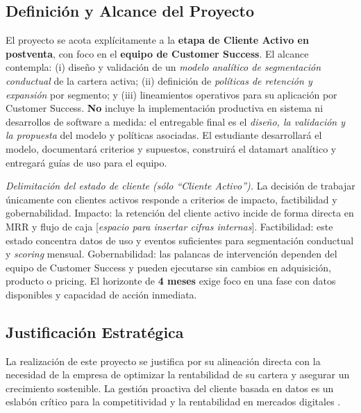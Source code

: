 \subsection{Definición y Alcance del Proyecto}

El proyecto se acota explícitamente a la \textbf{etapa de Cliente Activo en postventa}, con foco en el \textbf{equipo de Customer Success}. El alcance contempla: (i) diseño y validación de un \textit{modelo analítico de segmentación conductual} de la cartera activa; (ii) definición de \textit{políticas de retención y expansión} por segmento; y (iii) lineamientos operativos para su aplicación por Customer Success. \textbf{No} incluye la implementación productiva en sistema ni desarrollos de software a medida: el entregable final es el \textit{diseño, la validación y la propuesta} del modelo y políticas asociadas. El estudiante desarrollará el modelo, documentará criterios y supuestos, construirá el datamart analítico y entregará guías de uso para el equipo.

\textit{Delimitación del estado de cliente (sólo “Cliente Activo”).} La decisión de trabajar únicamente con clientes activos responde a criterios de impacto, factibilidad y gobernabilidad. Impacto: la retención del cliente activo incide de forma directa en MRR y flujo de caja [\textit{espacio para insertar cifras internas}]. Factibilidad: este estado concentra datos de uso y eventos suficientes para segmentación conductual y \textit{scoring} mensual. Gobernabilidad: las palancas de intervención dependen del equipo de Customer Success y pueden ejecutarse sin cambios en adquisición, producto o pricing. El horizonte de \textbf{4 meses} exige foco en una fase con datos disponibles y capacidad de acción inmediata.

\subsection{Justificación Estratégica}

La realización de este proyecto se justifica por su alineación directa con la necesidad de la empresa de optimizar la rentabilidad de su cartera y asegurar un crecimiento sostenible. La gestión proactiva del cliente basada en datos es un eslabón crítico para la competitividad y la rentabilidad en mercados digitales \citep{Kumar2010}.

